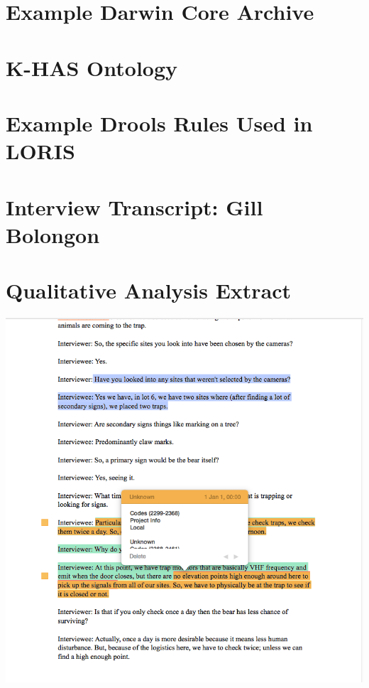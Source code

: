 \begin{appendices}
\chapter{Example Darwin Core Archive}\label{appendix:dwc}





\chapter{K-HAS Ontology}\label{appendix:ontology}


\chapter{Example Drools Rules Used in LORIS}\label{appendix:drools}


\chapter{Interview Transcript: Gill Bolongon}\label{appendix:interview}


\chapter{Qualitative Analysis Extract}\label{appendix:interview:extract}
\includegraphics[width=\textwidth]{App/figures/roshan_extract}
\end{appendices}